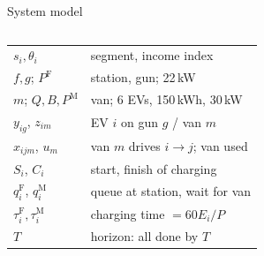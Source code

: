 \documentclass[aspectratio=169,11pt,t]{beamer}
\begin{document}
\begin{frame}{System model}
\begin{columns}[T]
\begin{tabular}{@{}ll@{}}
$s_i,\theta_i$ & segment, income index\\
$f,g$; $P^{\mathrm F}$ & station, gun; 22\,kW\\
$m$; $Q,B,P^{\mathrm M}$ & van; 6 EVs, 150\,kWh, 30\,kW\\
$y_{ig}$, $z_{im}$ & EV $i$ on gun $g$ / van $m$\\
$x_{ijm}$, $u_m$ & van $m$ drives $i\to j$; van used\\
$S_i$, $C_i$ & start, finish of charging\\
$q^{\mathrm F}_i$, $q^{\mathrm M}_i$ & queue at station, wait for van\\
$\tau^{\mathrm F}_i,\tau^{\mathrm M}_i$ & charging time $=60E_i/P$\\
$T$ & horizon: all done by $T$\\
\bottomrule
\end{tabular}
\end{columns}
\end{frame}
\end{document}
